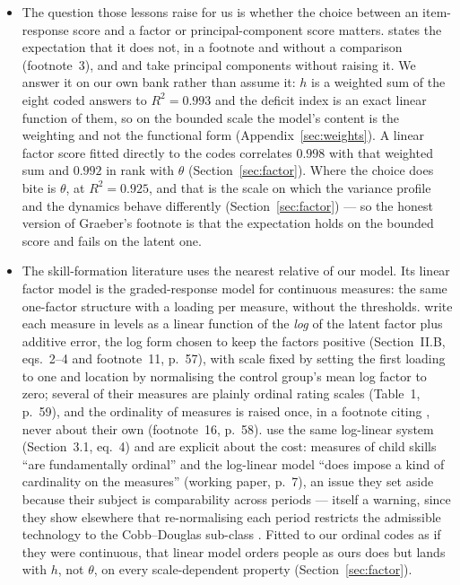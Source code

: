 \documentclass[11pt]{article}
\begin{document}
\begin{itemize}
\item The question those lessons raise for us is whether the choice between an item-response score and a factor or principal-component score matters. \citet{graeber2023} states the expectation that it does not, in a footnote and without a comparison (footnote~3), and \citet{poterba2013} and \citet{blundell2023} take principal components without raising it. We answer it on our own bank rather than assume it: $h$ is a weighted sum of the eight coded answers to $R^2 = 0.993$ and the deficit index is an exact linear function of them, so on the bounded scale the model's content is the weighting and not the functional form (Appendix~\ref{sec:weights}). A linear factor score fitted directly to the codes correlates $0.998$ with that weighted sum and $0.992$ in rank with $\theta$ (Section~\ref{sec:factor}). Where the choice does bite is $\theta$, at $R^2 = 0.925$, and that is the scale on which the variance profile and the dynamics behave differently (Section~\ref{sec:factor}) --- so the honest version of Graeber's footnote is that the expectation holds on the bounded score and fails on the latent one.
\item The skill-formation literature uses the nearest relative of our model. Its linear factor model is the graded-response model for continuous measures: the same one-factor structure with a loading per measure, without the thresholds. \citet{attanasio2020} write each measure in levels as a linear function of the \emph{log} of the latent factor plus additive error, the log form chosen to keep the factors positive (Section~II.B, eqs.~2--4 and footnote~11, p.~57), with scale fixed by setting the first loading to one and location by normalising the control group's mean log factor to zero; several of their measures are plainly ordinal rating scales (Table~1, p.~59), and the ordinality of measures is raised once, in a footnote citing \citet{nielsen2015}, never about their own (footnote~16, p.~58). \citet{agostinelli2025} use the same log-linear system (Section~3.1, eq.~4) and are explicit about the cost: measures of child skills ``are fundamentally ordinal'' and the log-linear model ``does impose a kind of cardinality on the measures'' (working paper, p.~7), an issue they set aside because their subject is comparability across periods --- itself a warning, since they show elsewhere that re-normalising each period restricts the admissible technology to the Cobb--Douglas sub-class \citep[Remarks~1--2]{agostinelli2016}. Fitted to our ordinal codes as if they were continuous, that linear model orders people as ours does but lands with $h$, not $\theta$, on every scale-dependent property (Section~\ref{sec:factor}).

\end{itemize}
\end{document}

